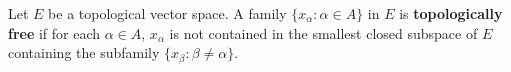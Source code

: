 Let $E$ be a topological vector space. A family $\{x_\alpha : \alpha \in A\}$ in $E$ is \textbf{topologically free} if for each $\alpha \in A$, $x_\alpha$ is not contained in the smallest closed subspace of $E$ containing the subfamily $\{x_\beta : \beta \neq \alpha\}$.
